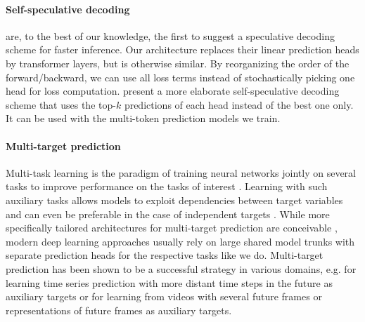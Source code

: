 \paragraph{Self-speculative decoding}
\citet{stern2018blockwise} are, to the best of our knowledge, the first to suggest a speculative decoding scheme for faster inference. Our architecture replaces their linear prediction heads by transformer layers, but is otherwise similar. By reorganizing the order of the forward/backward, we can use all loss terms instead of stochastically picking one head for loss computation. \citet{cai2024medusa} present a more elaborate self-speculative decoding scheme that uses the top-$k$ predictions of each head instead of the best one only. It can be used with the multi-token prediction models we train.

\paragraph{Multi-target prediction}
Multi-task learning is the paradigm of training neural networks jointly on several tasks to improve performance on the tasks of interest \citep{caruana1997multitask}. Learning with such auxiliary tasks allows models to exploit dependencies between target variables and can even be preferable in the case of independent targets \citep{waegeman2019multi}. While more specifically tailored architectures for multi-target prediction are conceivable \citep{spyromitros2016multi,read2021classifier}, modern deep learning approaches usually rely on large shared model trunks with separate prediction heads for the respective tasks \citep{caruana1997multitask,silver2016mastering,lample2022hypertree} like we do. Multi-target prediction has been shown to be a successful strategy in various domains, e.g. for learning time series prediction with more distant time steps in the future as auxiliary targets \citep{vapnik2009new} or for learning from videos with several future frames \citep{mathieu2016deep,srivastava2016unsupervised} or representations of future frames \citep{vondrick2016anticipating} as auxiliary targets.





















